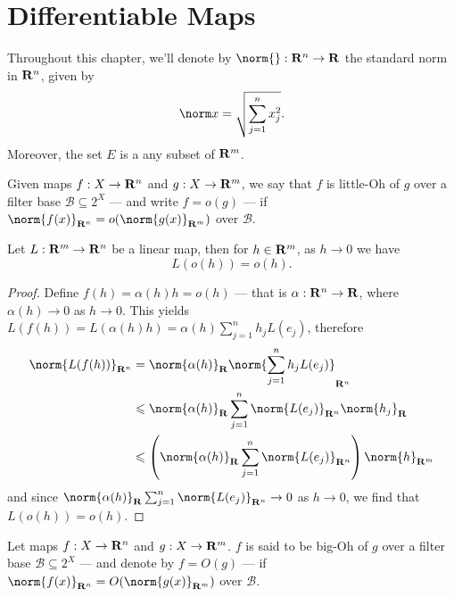 \section{Differentiable Maps}\label{sec:differentiable-maps}

\begin{remark}
  Throughout this chapter, we'll denote by \(\norm{}: \R^n \to \R\) the standard
  norm in \(\mathbf{R}^n\), given by
  \[
    \norm x = \sqrt{\sum_{j=1}^n x_j^2}.
  \]
  Moreover, the set \(E\) is a any subset of \(\mathbf{R}^m\).
\end{remark}

\begin{definition}[Little-Oh]
  Given maps \(f: X \to \mathbf{R}^n\) and \(g: X \to \mathbf{R}^m\), we say that \(f\) is
  little-Oh of \(g\) over a filter base \(\mathcal B \subseteq 2^X\) --- and
  write \(f = o(g)\) --- if \(\norm{f(x)}_{\R^n} = o(\norm{g(x)}_{\R^m})\) over
  \(\mathcal B\).
\end{definition}

\begin{proposition}\label{prop: linear-little-oh}
  Let \(L: \mathbf{R}^m \to \mathbf{R}^n\) be a linear map, then for \(h \in \mathbf{R}^m\), as \(h \to
  0\) we have
  \[
    L(o(h)) = o(h).
  \]
\end{proposition}

\begin{proof}
  Define \(f(h) = \alpha(h) h = o(h)\) --- that is \(\alpha: \mathbf{R}^n \to \mathbf{R}\),
  where \(\alpha(h) \to 0\) as \(h \to 0\). This yields \(L(f(h)) = L(\alpha(h)
  h) = \alpha(h) \sum_{j=1}^n h_j L(e_j)\), therefore
  \begin{align*}
    \norm{L(f(h))}_{\R^n}
    &= \norm{\alpha(h)}_\R \norm{\sum_{j=1}^n h_j L(e_j)}_{\R^n} \\
    &\leq \norm{\alpha(h)}_\R \sum_{j=1}^n \norm{L(e_j)}_{\R^n} \norm{h_j}_\R \\
    &\leq \left( \norm{\alpha(h)}_\R \sum_{j=1}^n \norm{L(e_j)}_{\R^n} \right)
    \norm{h}_{\R^m}
  \end{align*}
  and since \(\norm{\alpha(h)}_\R \sum_{j=1}^n \norm{L(e_j)}_{\R^n} \to 0\) as
  \(h \to 0\), we find that \(L(o(h)) = o(h)\).
\end{proof}

\begin{definition}[Big-Oh]
  Let maps \(f: X \to \mathbf{R}^n\) and \(g: X \to \mathbf{R}^m\). \(f\) is said to be big-Oh
  of \(g\) over a filter base \(\mathcal B \subseteq 2^X\) --- and denote by \(f
  = O(g)\) --- if \(\norm{f(x)}_{\R^n} = O(\norm{g(x)}_{\R^m})\) over \(\mathcal
  B\).
\end{definition}

